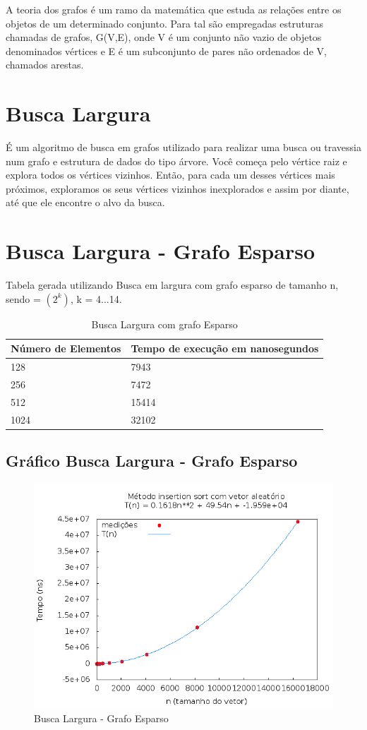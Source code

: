 \documentclass[12pt,a4paper,twoside]{report}
\begin{document}
A teoria dos grafos é um ramo da matemática que estuda as relações entre os objetos de um determinado conjunto. Para tal são empregadas estruturas chamadas de grafos, G(V,E), onde V é um conjunto não vazio de objetos denominados vértices e E é um subconjunto de pares não ordenados de V, chamados arestas.

\section{Busca Largura}

É um algoritmo de busca em grafos utilizado para realizar uma busca ou travessia num grafo e estrutura de dados do tipo árvore. Você começa pelo vértice raiz e explora todos os vértices vizinhos. Então, para cada um desses vértices mais próximos, exploramos os seus vértices vizinhos inexplorados e assim por diante, até que ele encontre o alvo da busca.

\section{Busca Largura - Grafo Esparso}
Tabela gerada utilizando Busca em largura com grafo esparso de tamanho n, sendo = $(2^k)$, k = 4...14.
\begin{table}[H]
\centering
\caption{Busca Largura com grafo Esparso}
\begin{tabular}{|l|l|}
\hline
\multicolumn{1}{|c|}{\textbf{Número de Elementos}} & \multicolumn{1}{c|}{\textbf{Tempo de execução em nanosegundos}} \\ \hline
128 & 7943 \\ \hline
256 & 7472 \\ \hline
512 & 15414 \\ \hline
1024 & 32102 \\ \hline
\end{tabular}
\end{table}

\subsection{Gráfico Busca Largura - Grafo Esparso}
\begin{figure}[H]
    \centering
    \includegraphics[width=0.7\linewidth]{graficos/Insertion/vIntAleatorio/vIntAleatorio.png}
  \caption{Busca Largura - Grafo Esparso}
\end{figure}
\end{document}
